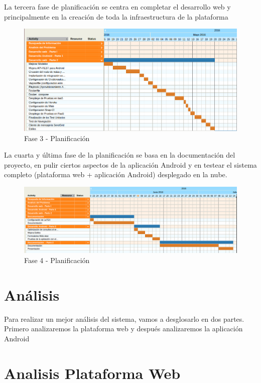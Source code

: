 \documentclass[a4paper,11pt]{book}
\begin{document}
La tercera fase de planificación se centra en completar el desarrollo web y principalmente en la creación de toda la infraestructura de la plataforma

\begin{figure}[H] 
\centering 
\includegraphics[scale=0.35]{imagenes/planificacion/planificacion3.png}
\caption{ Fase 3 - Planificación\cite{propio}  }  
\end{figure}

La cuarta y última fase de la planificación se basa en la documentación del proyecto, en pulir ciertos aspectos de la aplicación Android y en testear el sistema completo (plataforma web + aplicación Android) desplegado en la nube. 

\begin{figure}[H] 
\centering 
\includegraphics[scale=0.35]{imagenes/planificacion/planificacion4.png}
\caption{ Fase 4 - Planificación\cite{propio}  }  
\end{figure}



\section{Análisis}
Para realizar un mejor análisis del sistema, vamos a desglosarlo en dos partes. Primero analizaremos la plataforma web y después analizaremos la aplicación Android 

\section{Analisis Plataforma Web}
\end{document}
